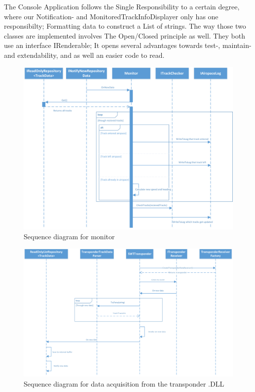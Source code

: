 The Console Application follows the Single Responsibility to a certain degree, where our Notification- and MonitoredTrackInfoDisplayer only has one responsibilty; Formatting data to construct a List of strings. The way those two classes are implemented involves The Open/Closed principle as well. They both use an interface IRenderable; It opens several advantages towards test-, maintain- and extendability, and as well an easier code to read. 
\begin{figure}[h!]
	\centering
	\includegraphics[width=1.0\linewidth]{Images/MonitorSeq}
	\caption{Sequence diagram for monitor}
	\label{fig:MonitorSeq}
\end{figure}

\begin{figure}[h!]
	\centering
	\includegraphics[width=1.0\linewidth]{Images/SWTTransponder}
	\caption{Sequence diagram for data acquisition from the transponder .DLL}
	\label{fig:SWTTransponderSeq}
\end{figure}
\clearpage
